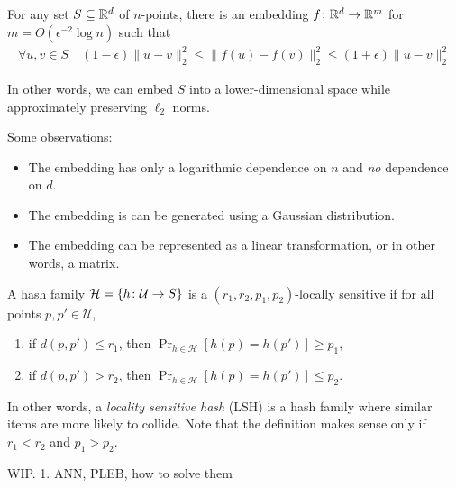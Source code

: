 \documentclass{article}
\begin{document}
\begin{lemma}
For any set $S \subseteq \mathbb{R}^d$ of $n$-points, there is an embedding $f \colon \mathbb{R}^d \to \mathbb{R}^m$ for $m = O(\epsilon^{-2} \log n)$ such that
\begin{align}
  \forall u, v \in S \quad (1 - \epsilon) \|u - v\|_2^2 \le \|f(u) - f(v)\|_2^2 \le (1 + \epsilon) \|u - v\|_2^2
\end{align}
\end{lemma}
In other words, we can embed $S$ into a lower-dimensional space while approximately preserving $\ell_2$ norms.

Some observations:
\begin{itemize}
  \item The embedding has only a logarithmic dependence on $n$ and \emph{no} dependence on $d$.
  \item The embedding is can be generated using a Gaussian distribution.
  \item The embedding can be represented as a linear transformation, or in other words, a matrix.
\end{itemize}

\begin{definition}
  A hash family $\mathcal{H} = \{h \colon \mathcal{U} \to S\}$ is a $(r_1, r_2, p_1, p_2)$-locally sensitive if for all points $p, p' \in \mathcal{U}$,

  \begin{enumerate}
    \item if $d(p, p') \le r_1$, then $\Pr_{h \in \mathcal{H}}[h(p) = h(p')] \ge p_1$,
    \item if $d(p, p') > r_2$, then $\Pr_{h \in \mathcal{H}}[h(p) = h(p')] \le p_2$.
  \end{enumerate}

\end{definition}
In other words, a \emph{locality sensitive hash} (LSH) is a hash family where similar items are more likely to collide.
Note that the definition makes sense only if $r_1 < r_2$ and $p_1 > p_2$.

WIP.
1. ANN, PLEB, how to solve them
\end{document}
